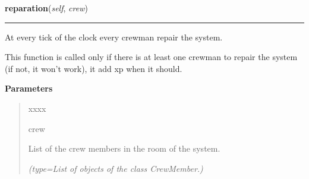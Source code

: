 \hspace{.8\funcindent}\begin{boxedminipage}{\funcwidth}

    \raggedright \textbf{reparation}(\textit{self}, \textit{crew})

    \vspace{-1.5ex}

    \rule{\textwidth}{0.5\fboxrule}
\setlength{\parskip}{2ex}
    At every tick of the clock every crewman repair the system.

    This function is called only if there is at least one crewman to repair
    the system (if not, it won't work), it add xp when it should.

\setlength{\parskip}{1ex}
      \textbf{Parameters}
      \vspace{-1ex}

      \begin{quote}
        \begin{Ventry}{xxxx}

          \item[crew]

          List of the crew members in the room of the system.

            {\it (type=List of objects of the class CrewMember.)}

        \end{Ventry}

      \end{quote}

    \end{boxedminipage}

    \label{systems:System:dotFire}

    \vspace{0.5ex}


